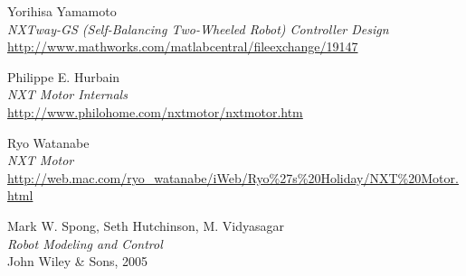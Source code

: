 \documentclass[a4paper]{article}
\begin{document}
\begin{thebibliography}{99}

    Yorihisa Yamamoto \\
    \textsl{NXTway-GS (Self-Balancing Two-Wheeled Robot) Controller Design} \\
    \href{http://www.mathworks.com/matlabcentral/fileexchange/19147}
         {http://www.mathworks.com/matlabcentral/fileexchange/19147}

    Philippe E. Hurbain \\
    \textsl{NXT Motor Internals} \\
    \href{http://www.philohome.com/nxtmotor/nxtmotor.htm}
         {http://www.philohome.com/nxtmotor/nxtmotor.htm}

    Ryo Watanabe \\
    \textsl{NXT Motor} \\
    \href{http://web.mac.com/ryo_watanabe/iWeb/Ryo%27s%20Holiday/NXT%20Motor.html}
         {http://web.mac.com/ryo\_watanabe/iWeb/Ryo\%27s\%20Holiday/NXT\%20Motor.html}
\fi

    Mark W. Spong, Seth Hutchinson, M. Vidyasagar \\
    \textsl{Robot Modeling and Control} \\
    John Wiley \& Sons, 2005

\end{thebibliography}
\end{document}
